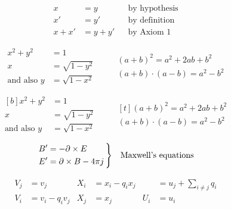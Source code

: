 \documentclass{article}
\begin{document}
\renewcommand\minalignsep{2em}
\begin{align}
  x      &= y      && \text{by hypothesis} \\
      x' &= y'     && \text{by definition} \\
  x + x' &= y + y' && \text{by Axiom 1}
\end{align}

\begin{equation}
\begin{aligned}
  x^2 + y^2  &= 1               \\
  x          &= \sqrt{1-y^2}    \\
 \text{and also }y &= \sqrt{1-x^2}
\end{aligned}               \qquad
\begin{gathered}
 (a + b)^2 = a^2 + 2ab + b^2    \\
 (a + b) \cdot (a - b) = a^2 - b^2
\end{gathered}      \end{equation}

\begin{equation}
\begin{aligned}[b]
  x^2 + y^2  &= 1               \\
  x          &= \sqrt{1-y^2}    \\
 \text{and also }y &= \sqrt{1-x^2}
\end{aligned}               \qquad
\begin{gathered}[t]
 (a + b)^2 = a^2 + 2ab + b^2    \\
 (a + b) \cdot (a - b) = a^2 - b^2
\end{gathered}
\end{equation}
\newenvironment{rcase}
    {\left.\begin{aligned}}
    {\end{aligned}\right\rbrace}

\begin{equation*}
  \begin{rcase}
    B' &= -\partial\times E          \\
    E' &=  \partial\times B - 4\pi j \,
  \end{rcase}
  \quad \text {Maxwell's equations}
\end{equation*}

\begin{equation} \begin{aligned}
  V_j &= v_j                      &
  X_i &= x_i - q_i x_j            &
      &= u_j + \sum_{i\ne j} q_i \\
  V_i &= v_i - q_i v_j            &
  X_j &= x_j                      &
  U_i &= u_i
\end{aligned} \end{equation}
\end{document}
